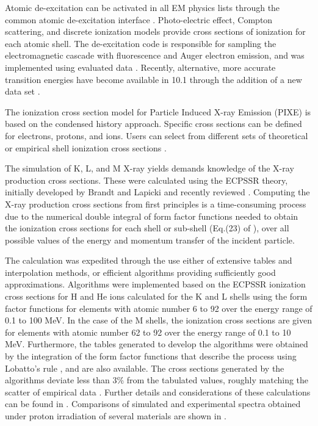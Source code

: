 
Atomic de-excitation can be activated in all EM physics lists through the common
atomic de-excitation interface  \cite{bib:uni}.
Photo-electric effect, Compton scattering, and discrete ionization models 
provide cross sections of ionization for each atomic shell.  The de-excitation
code is responsible for sampling the electromagnetic cascade with fluorescence
and Auger electron emission, and was implemented using evaluated data 
\cite{embib:eadl}. Recently, alternative, more accurate transition energies have
become available in \Gfour{} 10.1 through the addition of a new data set 
\cite{embib:SPaltani}.

The ionization cross section model for Particle Induced X-ray Emission (PIXE) is
based on the condensed history approach.  Specific cross sections can be defined
for electrons, protons, and ions.  Users can select from different sets of 
theoretical or empirical shell ionization cross sections \cite{embib:pixe}.

The simulation of K, L, and M X-ray yields demands knowledge of the X-ray 
production cross sections.  These were calculated using the ECPSSR theory, 
initially developed by Brandt and Lapicki \cite{embib:deex1} and recently 
reviewed \cite{embib:deex2,embib:deex3}.  Computing the X-ray production cross 
sections from first principles is a time-consuming process due to the numerical 
double integral of form factor functions needed to obtain the ionization cross 
sections for each shell or sub-shell (Eq.(23) of \cite{embib:deex2}), over all 
possible values of the energy and momentum transfer of the incident particle.  

The calculation was expedited through the use either of extensive tables and
interpolation methods, or efficient algorithms providing sufficiently good
approximations.
Algorithms were implemented based on the ECPSSR ionization cross sections for
H and He ions calculated for the K and L shells using the form factor functions
for elements with atomic number 6 to 92 over the energy range of 0.1 to 100 
MeV.  In the case of the M shells, the ionization cross sections are given 
for elements with atomic number 62 to 92 over the energy range of 0.1 to 10 MeV.
Furthermore, the tables generated to develop the algorithms were obtained by
the integration of the form factor functions that describe the process using 
Lobatto's rule \cite{embib:deex4}, and are also available.  The cross sections
generated by the algorithms deviate less than 3\% from the tabulated values, 
roughly matching the scatter of empirical data \cite{embib:deex2}.  Further 
details and considerations of these calculations can be found in 
\cite{embib:deex2,embib:deex3}.  Comparisons of simulated and experimental 
spectra obtained under proton irradiation of several materials are shown in
\cite{embib:deex5,embib:deex6}.

